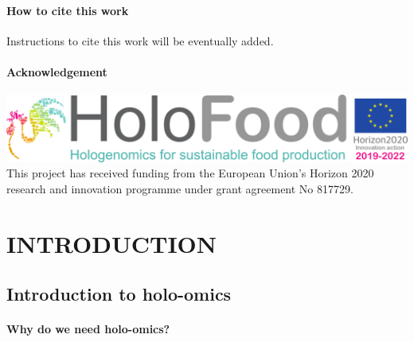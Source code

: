 \documentclass[
]{book}
\begin{document}
\hypertarget{how-to-cite-this-work}{%
\subsection*{How to cite this work}\label{how-to-cite-this-work}}

Instructions to cite this work will be eventually added.

\hypertarget{acknowledgement}{%
\subsection*{Acknowledgement}\label{acknowledgement}}

\includegraphics{images/holofood_logo_large.png}
This project has received funding from the European Union's Horizon 2020 research and innovation programme under grant agreement No 817729.

\hypertarget{part-introduction}{%
\part{INTRODUCTION}\label{part-introduction}}

\hypertarget{holo-omics}{%
\chapter{Introduction to holo-omics}\label{holo-omics}}

\hypertarget{why-holo-omics}{%
\subsection*{Why do we need holo-omics?}\label{why-holo-omics}}
\end{document}
